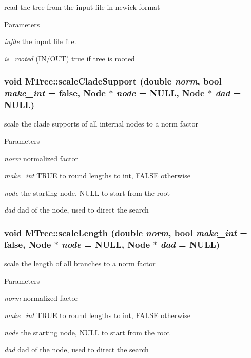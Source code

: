 read the tree from the input file in newick format 
\begin{DoxyParams}{Parameters}
\item[{\em infile}]the input file file. \item[{\em is\_\-rooted}](IN/OUT) true if tree is rooted \end{DoxyParams}
\hypertarget{classMTree_a3d183600999c6af85817be3959b43ca8}{
\subsubsection[{scaleCladeSupport}]{\setlength{\rightskip}{0pt plus 5cm}void MTree::scaleCladeSupport (double {\em norm}, \/  bool {\em make\_\-int} = {\ttfamily false}, \/  {\bf Node} $\ast$ {\em node} = {\ttfamily NULL}, \/  {\bf Node} $\ast$ {\em dad} = {\ttfamily NULL})}}
\label{classMTree_a3d183600999c6af85817be3959b43ca8}
scale the clade supports of all internal nodes to a norm factor 
\begin{DoxyParams}{Parameters}
\item[{\em norm}]normalized factor \item[{\em make\_\-int}]TRUE to round lengths to int, FALSE otherwise \item[{\em node}]the starting node, NULL to start from the root \item[{\em dad}]dad of the node, used to direct the search \end{DoxyParams}
\hypertarget{classMTree_a2f178b012e999e855bafa053a8caba8f}{
\subsubsection[{scaleLength}]{\setlength{\rightskip}{0pt plus 5cm}void MTree::scaleLength (double {\em norm}, \/  bool {\em make\_\-int} = {\ttfamily false}, \/  {\bf Node} $\ast$ {\em node} = {\ttfamily NULL}, \/  {\bf Node} $\ast$ {\em dad} = {\ttfamily NULL})}}
\label{classMTree_a2f178b012e999e855bafa053a8caba8f}
scale the length of all branches to a norm factor 
\begin{DoxyParams}{Parameters}
\item[{\em norm}]normalized factor \item[{\em make\_\-int}]TRUE to round lengths to int, FALSE otherwise \item[{\em node}]the starting node, NULL to start from the root \item[{\em dad}]dad of the node, used to direct the search \end{DoxyParams}
